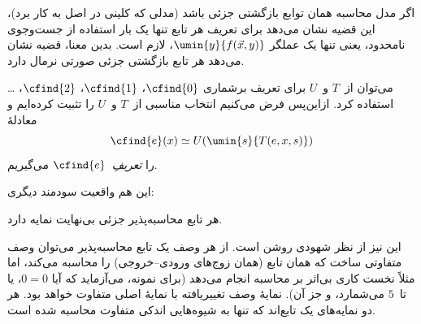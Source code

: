 \documentclass[../../../include/open-logic-section]{subfiles}
\begin{document}
اگر مدل محاسبه همان توابع بازگشتی جزئی باشد (مدلی که کلینی در اصل به
کار برد)، این قضیه نشان می‌دهد برای تعریف هر تابع تنها یک بار استفاده
از جست‌وجوی نامحدود، یعنی تنها یک عملگر
$\umin{y}{f(\vec x,y)}$، لازم است. بدین معنا، قضیه نشان می‌دهد هر تابع
بازگشتی جزئی صورتی نرمال دارد.

می‌توان از~$T$ و~$U$ برای تعریف برشماری
$\cfind{0}$، $\cfind{1}$، $\cfind{2}$، \dots استفاده کرد. ازاین‌پس
فرض می‌کنیم انتخاب مناسبی از~$T$ و~$U$ را تثبیت کرده‌ایم و معادلهٔ
\[
\cfind{e}(x) \simeq U(\umin{s}{T(e,x,s)})
\]
را 
\emph{تعریفِ}~$\cfind{e}$ می‌گیریم.

این هم واقعیت سودمند دیگری:

\begin{thm}
هر تابع محاسبه‌پذیر جزئی بی‌نهایت نمایه دارد.
\end{thm}

این نیز از نظر شهودی روشن است. از هر وصف یک تابع محاسبه‌پذیر می‌توان
وصف متفاوتی ساخت که همان تابع (همان زوج‌های ورودی--خروجی) را محاسبه
می‌کند، اما مثلاً نخست کاری بی‌اثر بر محاسبه انجام می‌دهد (برای نمونه،
می‌آزماید که آیا $0=0$، یا تا~$5$ می‌شمارد، و جز آن). نمایهٔ وصف
تغییریافته با نمایهٔ اصلی متفاوت خواهد بود. هر دو نمایه‌های یک تابع‌اند
که تنها به شیوه‌هایی اندکی متفاوت محاسبه شده است.
\end{document}
